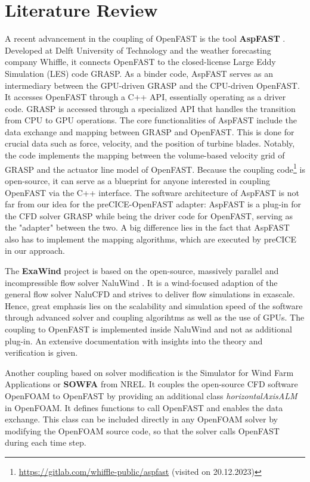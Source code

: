 \section{Literature Review}
\label{section:review}

A recent advancement in the coupling of OpenFAST is the tool \textbf{AspFAST} \cite{Taschner:2022}. Developed at Delft University of Technology and the weather forecasting company Whiffle, it connects OpenFAST to the closed-license Large Eddy Simulation (LES) code GRASP. 
As a binder code, AspFAST serves as an intermediary between the GPU-driven GRASP and the CPU-driven OpenFAST. It accesses OpenFAST through a C++ API, essentially operating as a driver code. GRASP is accessed through a specialized API that handles the transition from CPU to GPU operations.
The core functionalities of AspFAST include the data exchange and mapping between GRASP and OpenFAST. This is done for crucial data such as force, velocity, and the position of turbine blades. Notably, the code implements the mapping between the volume-based velocity grid of GRASP and the actuator line model of OpenFAST. Because the coupling  code\footnote{\url{https://gitlab.com/whiffle-public/aspfast} (visited on 20.12.2023)} is open-source, it can serve as a blueprint for anyone interested in coupling OpenFAST via the C++ interface.
The software architecture of AspFAST is not far from our idea for the preCICE-OpenFAST adapter: AspFAST is a plug-in for the CFD solver GRASP while being the driver code for OpenFAST, serving as the "adapter" between the two. A big difference lies in the fact that AspFAST also has to implement the mapping algorithms, which are executed by preCICE in our approach.

The \textbf{ExaWind} project \cite{Sprague:2019} is based on the open-source, massively parallel and incompressible flow solver NaluWind \cite{Ananthan:2019}. It is a wind-focused adaption of the general flow solver NaluCFD and strives to deliver flow simulations in exascale. Hence, great emphasis lies on the scalability and simulation speed of the software through advanced solver and coupling algorihtms as well as the use of GPUs. The coupling to OpenFAST is implemented inside NaluWind and not as additional plug-in. An extensive documentation with insights into the theory and verification is given. 

Another coupling based on solver modification is the Simulator for Wind Farm Applications or \textbf{SOWFA} \cite{Churchfield:2012} from NREL. It couples the open-source CFD software OpenFOAM to OpenFAST by providing an additional  class \textit{horizontalAxisALM} in OpenFOAM. It defines functions to call OpenFAST and enables the data exchange. This class can be included directly in any OpenFOAM solver by modifying the OpenFOAM source code, so that the solver calls OpenFAST during each time step.

